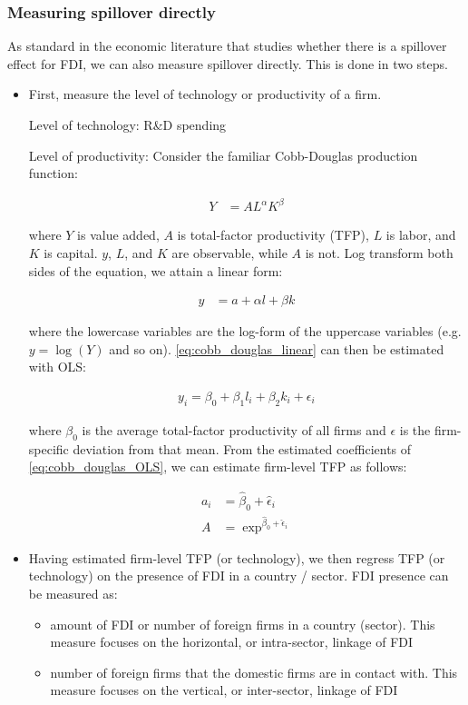 \subsubsection*{Measuring spillover directly}

As standard in the economic literature that studies whether there is a spillover effect for FDI, we can also measure spillover directly. This is done in two steps.

\begin{itemize}
\item First, measure the level of technology or productivity of a firm.

Level of technology: R\&D spending

Level of productivity: Consider the familiar Cobb-Douglas production function:

\begin{align}
Y &= AL^{\alpha}K^{\beta}
\end{align}

where $Y$ is value added, $A$ is total-factor productivity (TFP), $L$ is labor, and $K$ is capital. $y$, $L$, and $K$ are observable, while $A$ is not. Log transform both sides of the equation, we attain a linear form:

\begin{align} \label{eq:cobb_douglas_linear}
y &= a + \alpha l + \beta k
\end{align}

where the lowercase variables are the log-form of the uppercase variables (e.g. $y = \log(Y)$ and so on). \autoref{eq:cobb_douglas_linear} can then be estimated with OLS:

\begin{align} \label{eq:cobb_douglas_OLS}
y_i = \beta_0 + \beta_1 l_i + \beta_2 k_i + \epsilon_i
\end{align} 

where $\beta_0$ is the average total-factor productivity of all firms and $\epsilon$ is the firm-specific deviation from that mean. From the estimated coefficients of \autoref{eq:cobb_douglas_OLS}, we can estimate firm-level TFP as follows:

\begin{align}
a_i &= \hat\beta_0 + \hat\epsilon_i \\
A &= \exp^{\hat\beta_0 + \hat\epsilon_i}
\end{align}

\item Having estimated firm-level TFP (or technology), we then regress TFP (or technology) on the presence of FDI in a country / sector. FDI presence can be measured as:
\begin{itemize}
\item amount of FDI or number of foreign firms in a country (sector). This measure focuses on the horizontal, or intra-sector, linkage of FDI
\item number of foreign firms that the domestic firms are in contact with. This measure focuses on the vertical, or inter-sector, linkage of FDI
\end{itemize}
\end{itemize}



